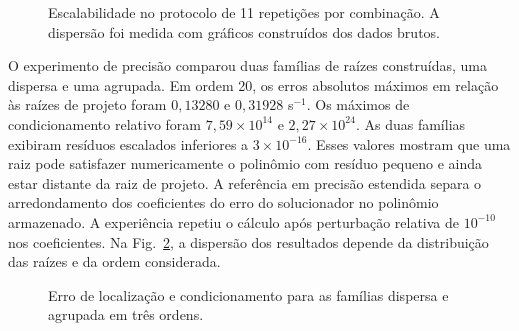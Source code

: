 \begin{figure}[!tp]
\centering
{}
\caption{Escalabilidade no protocolo de 11 repetições por combinação.
A dispersão foi medida com gráficos construídos dos dados brutos.}
\label{fig:bench}
\end{figure}

O experimento de precisão comparou duas famílias de raízes
construídas, uma dispersa e uma agrupada. Em ordem 20, os erros
absolutos máximos em relação às raízes de projeto foram
$0{,}13280$ e $0{,}31928$ s$^{-1}$. Os máximos de
condicionamento relativo foram $7{,}59\times10^{14}$ e
$2{,}27\times10^{24}$. As duas famílias exibiram resíduos
escalados inferiores a $3\times10^{-16}$. Esses valores mostram
que uma raiz pode satisfazer numericamente o polinômio com
resíduo pequeno e ainda estar distante da raiz de projeto.
A referência em precisão estendida separa o arredondamento
dos coeficientes do erro do solucionador no polinômio
armazenado. A experiência repetiu o cálculo após perturbação
relativa de $10^{-10}$ nos coeficientes.
Na Fig.~\ref{fig:precision}, a dispersão dos resultados depende
da distribuição das raízes e da ordem considerada.

\begin{figure}[!tp]
\centering
{}
\caption{Erro de localização e condicionamento para as famílias
dispersa e agrupada em três ordens.}
\label{fig:precision}
\end{figure}
